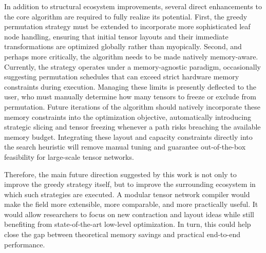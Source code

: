 In addition to structural ecosystem improvements, several direct enhancements to the core algorithm are required to fully realize its potential. First, the greedy permutation strategy must be extended to incorporate more sophisticated leaf node handling, ensuring that initial tensor layouts and their immediate transformations are optimized globally rather than myopically. Second, and perhaps more critically, the algorithm needs to be made natively memory-aware. Currently, the strategy operates under a memory-agnostic paradigm, occasionally suggesting permutation schedules that can exceed strict hardware memory constraints during execution. Managing these limits is presently deflected to the user, who must manually determine how many tensors to freeze or exclude from permutation. Future iterations of the algorithm should natively incorporate these memory constraints into the optimization objective, automatically introducing strategic slicing and tensor freezing whenever a path risks breaching the available memory budget. Integrating these layout and capacity constraints directly into the search heuristic will remove manual tuning and guarantee out-of-the-box feasibility for large-scale tensor networks.

Therefore, the main future direction suggested by this work is not only to improve the greedy strategy itself, but to improve the surrounding ecosystem in which such strategies are executed. A modular tensor network compiler would make the field more extensible, more comparable, and more practically useful. It would allow researchers to focus on new contraction and layout ideas while still benefiting from state-of-the-art low-level optimization. In turn, this could help close the gap between theoretical memory savings and practical end-to-end performance.
